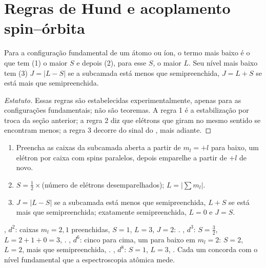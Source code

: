 \section{Regras de Hund e acoplamento spin--órbita}

\begin{proposition}\label{prop:b3:many-electron-atoms:hund-terms}
Para a configuração fundamental de um átomo ou íon, o termo mais baixo é o
que tem (1) o maior $S$ e depois (2), para esse $S$, o maior $L$. Seu nível
mais baixo tem (3) $J = |L - S|$ se a subcamada está menos que semipreenchida, $J = L +
S$ se está mais que semipreenchida.
\end{proposition}
\begin{proof}[Estatuto]
Essas regras são estabelecidas experimentalmente, apenas para as
configurações fundamentais; não são teoremas. A regra 1 é a estabilização
por troca da seção anterior; a regra 2 diz que elétrons que giram no mesmo
sentido se encontram menos; a regra 3 decorre do sinal do , mais adiante.
\end{proof}

\begin{method}\label{met:b3:many-electron-atoms:ground-term}
\begin{enumerate}
  \item Preencha as caixas da subcamada aberta a partir de $m_l = +l$ para baixo,
        um elétron por caixa com spins paralelos, depois emparelhe a partir de $+l$ de novo.
  \item $S = \frac12 \times$(número de elétrons desemparelhados); $L = |\sum m_l|$.
  \item $J = |L - S|$ se a subcamada está menos que semipreenchida, $L + S$ se
        está mais que semipreenchida; exatamente semipreenchida, $L = 0$ e $J = S$.
\end{enumerate}
\end{method}

\begin{example}\label{ex:b3:many-electron-atoms:ground-terms}
, $d^2$: caixas $m_l = 2, 1$ preenchidas, $S = 1$, $L = 3$, $J = 2$:
. , $d^3$: $S = \frac32$, $L = 2 + 1 + 0 = 3$,
. , $d^6$: cinco para cima, um para baixo em $m_l = 2$:
$S = 2$, $L = 2$, mais que semipreenchida, . , $d^8$:
$S = 1$, $L = 3$, . Cada um concorda com o nível fundamental
que a espectroscopia atômica mede.
\end{example}

